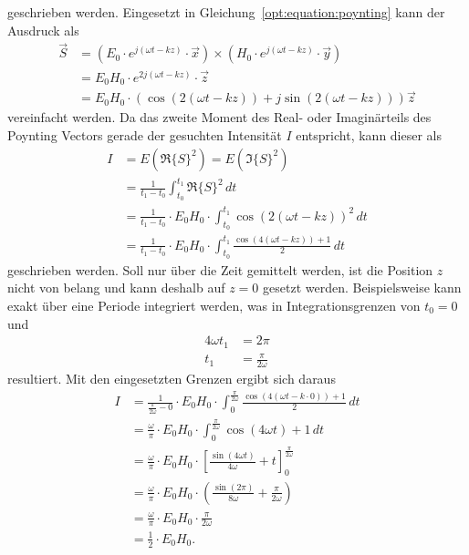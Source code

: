 geschrieben werden.
Eingesetzt in Gleichung~\ref{opt:equation:poynting} kann der Ausdruck als
\begin{align}
\vec{S}
&=
\left(E_0 \cdot e^{j(\omega t-k z)} \cdot \vec{x}\right) \times \left(H_0 \cdot e^{j(\omega t-k z)} \cdot \vec{y}\right)
\\
&=
E_0 H_0 \cdot e^{2j(\omega t-k z)} \cdot \vec{z}
\\
&=
E_0 H_0 \cdot \left(\cos{(2(\omega t-kz))}+j\sin{(2(\omega t-kz))}\right) \vec{z}
\end{align}
vereinfacht werden.
Da das zweite Moment des Real- oder Imaginärteils des Poynting Vectors gerade der gesuchten Intensität $I$ entspricht, kann dieser als 
\begin{align}
I
&=
E(\Re\{S\}^2)
=
E(\Im\{S\}^2)
\\
&=
\frac{1}{t_1- t_0} \int_{t_0}^{t_1} \Re\{S\}^2 \,dt
\\
&=
\frac{1}{t_1 - t_0} \cdot E_0 H_0 \cdot \int_{t_0}^{t_1}\cos\left({2(\omega t-kz)}\right)^2 \,dt
\\
&=
\frac{1}{t_1 - t_0} \cdot E_0 H_0 \cdot \int_{t_0}^{t_1}\frac{\cos(4(\omega t-kz)) + 1}{2} \,dt
\end{align}
geschrieben werden.
Soll nur über die Zeit gemittelt werden, ist die Position $z$ nicht von belang und kann deshalb auf $z=0$ gesetzt werden.
Beispielsweise kann exakt über eine Periode integriert werden, was in Integrationsgrenzen von $t_0=0$ und
\begin{align}
4\omega t_1
&=
2\pi
\\
t_1
&=
\frac{\pi}{2\omega}
\end{align}
resultiert.
Mit den eingesetzten Grenzen ergibt sich daraus
\begin{align}
I
&=
\frac{1}{\frac{\pi}{2\omega} - 0} \cdot E_0 H_0 \cdot \int_{0}^{\frac{\pi}{2\omega}}\frac{\cos(4(\omega t-k\cdot0)) + 1}{2} \,dt
\\
&=
\frac{\omega}{\pi} \cdot E_0 H_0 \cdot \int_{0}^{\frac{\pi}{2\omega}}\cos(4\omega t) + 1 \,dt
\\
&=
\frac{\omega}{\pi} \cdot E_0 H_0 \cdot \left[\frac{\sin(4\omega t)}{4\omega} + t \right]_{0}^{\frac{\pi}{2\omega}}
\\
&=
\frac{\omega}{\pi} \cdot E_0 H_0 \cdot \left(\frac{\sin(2\pi)}{8\omega} + \frac{\pi}{2\omega}\right)
\\
&=
\frac{\omega}{\pi} \cdot E_0 H_0 \cdot \frac{\pi}{2\omega}
\\
&=
\frac{1}{2} \cdot E_0 H_0
.
\end{align}
